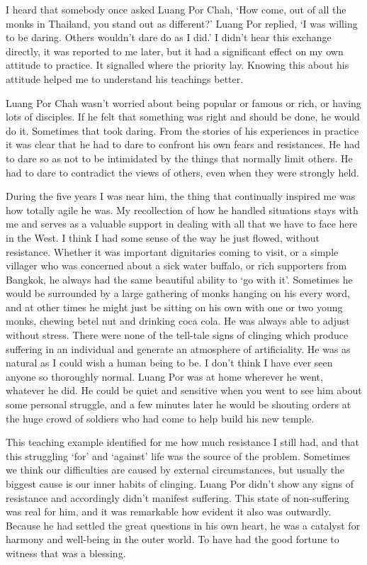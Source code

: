 I heard that somebody once asked Luang Por Chah, `How come, out of all
the monks in Thailand, you stand out as different?' Luang Por replied, `I was willing to be daring. Others wouldn't dare do as I did.' I didn't
hear this exchange directly, it was reported to me later, but it had a
significant effect on my own attitude to practice. It signalled where
the priority lay. Knowing this about his attitude helped me to
understand his teachings better. 

Luang Por Chah wasn't worried about being popular or famous or rich, or
having lots of disciples. If he felt that something was right and should
be done, he would do it. Sometimes that took daring. From the stories of
his experiences in practice it was clear that he had to dare to confront
his own fears and resistances. He had to dare so as not to be
intimidated by the things that normally limit others. He had to dare to
contradict the views of others, even when they were strongly held. 

During the five years I was near him, the thing that continually
inspired me was how totally agile he was. My recollection of how he
handled situations stays with me and serves as a valuable support in
dealing with all that we have to face here in the West. I think I had
some sense of the way he just flowed, without resistance. Whether it was
important dignitaries coming to visit, or a simple villager who was
concerned about a sick water buffalo, or rich supporters from Bangkok, 
he always had the same beautiful ability to `go with it'. Sometimes he
would be surrounded by a large gathering of monks hanging on his every
word, and at other times he might just be sitting on his own with one or
two young monks, chewing betel nut and drinking coca cola. He was always
able to adjust without stress. There were none of the tell-tale signs of
clinging which produce suffering in an individual and generate an
atmosphere of artificiality. He was as natural as I could wish a human
being to be. I don't think I have ever seen anyone so thoroughly normal. 
Luang Por was at home wherever he went, whatever he did. He could be
quiet and sensitive when you went to see him about some personal
struggle, and a few minutes later he would be shouting orders at the
huge crowd of soldiers who had come to help build his new temple. 

This teaching example identified for me how much resistance I still had, 
and that this struggling `for' and `against' life was the source of the
problem. Sometimes we think our difficulties are caused by external
circumstances, but usually the biggest cause is our inner habits of
clinging. Luang Por didn't show any signs of resistance and accordingly
didn't manifest suffering. This state of non-suffering was real for him, 
and it was remarkable how evident it also was outwardly. Because he had
settled the great questions in his own heart, he was a catalyst for
harmony and well-being in the outer world. To have had the good fortune
to witness that was a blessing. 

